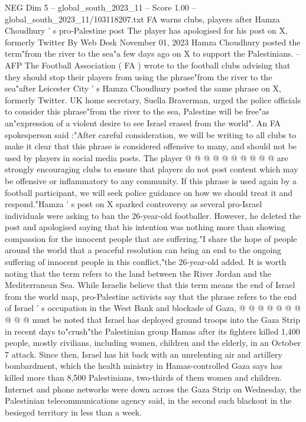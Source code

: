 \begin{textsample}{NEG Dim 5 – global\_south\_2023\_11 – Score 1.00 – global\_south\_2023\_11/103118207.txt}  \label{ex:f5_neg_207}
FA warns clubs, players after Hamza Choudhury ' s pro-Palestine post The player has apologised for his post on X, formerly Twitter By Web Desk November 01, 2023 Hamza Choudhury posted the term"from the river to the sea"a few days ago on X to support the Palestinians. -- AFP The Football Association ( FA ) wrote to the football clubs advising that they should stop their players from using the phrase"from the river to the sea"after Leicester City ' s Hamza Choudhury posted the same phrase on X, formerly Twitter.
UK home secretary, Suella Braverman, urged the police officials to consider this phrase"from the river to the sea, Palestine will be free"as an"expression of a violent desire to see Israel erased from the world".
An FA spokesperson said :"After careful consideration, we will be writing to all clubs to make it clear that this phrase is considered offensive to many, and should not be used by players in social media posts.
The player @ @ @ @ @ @ @ @ @ @ are strongly encouraging clubs to ensure that players do not post content which may be offensive or inflammatory to any community.
If this phrase is used again by a football participant, we will seek police guidance on how we should treat it and respond."Hamza ' s post on X sparked controversy as several pro-Israel individuals were asking to ban the 26-year-old footballer.
However, he deleted the post and apologised saying that his intention was nothing more than showing compassion for the innocent people that are suffering."I share the hope of people around the world that a peaceful resolution can bring an end to the ongoing suffering of innocent people in this conflict,"the 26-year-old added.
It is worth noting that the term refers to the land between the River Jordan and the Mediterranean Sea.
While Israelis believe that this term means the end of Israel from the world map, pro-Palestine activists say that the phrase refers to the end of Israel ' s occupation in the West Bank and blockade of Gaza, @ @ @ @ @ @ @ @ @ @ must be noted that Israel has deployed ground troops into the Gaza Strip in recent days to"crush"the Palestinian group Hamas after its fighters killed 1,400 people, mostly civilians, including women, children and the elderly, in an October 7 attack.
Since then, Israel has hit back with an unrelenting air and artillery bombardment, which the health ministry in Hamas-controlled Gaza says has killed more than 8,500 Palestinians, two-thirds of them women and children.
Internet and phone networks were down across the Gaza Strip on Wednesday, the Palestinian telecommunications agency said, in the second such blackout in the besieged territory in less than a week.

\end{textsample}
